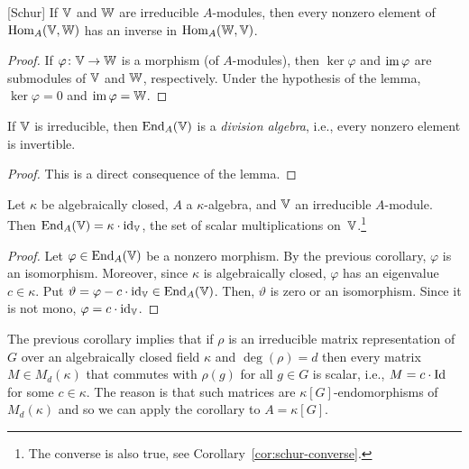 \begin{lem}\label{lem:schur}{\rm[Schur]}
    If\/ $\mathbb V$ and\/ $\mathbb W$ are irreducible\/ $A$-modules, then every nonzero element of\/ ${\rm Hom}_A(\mathbb V,\mathbb W)$ has an inverse in\/ ${\rm Hom}_A(\mathbb W,\mathbb V)$.
\end{lem}

\begin{proof}
    If $\varphi\colon\mathbb V\to\mathbb W$ is a morphism (of $A$-modules), then $\ker\varphi$ and $\operatorname{im}\varphi$ are submodules of $\mathbb V$ and $\mathbb W$, respectively. Under the hypothesis of the lemma, $\ker\varphi=0$ and $\operatorname{im}\varphi=\mathbb W$.
\end{proof}

\begin{cor}
    If\/ $\mathbb V$ is irreducible, then\/ ${\operatorname{End}}_A(\mathbb V)$ is a \textsl{division algebra}, i.e., every nonzero element is invertible.
\end{cor}

\begin{proof}
    This is a direct consequence of the lemma.
\end{proof}

\begin{cor}\label{cor:alg-closed-scalar-multiplications}
    Let\/ $\kappa$ be algebraically closed, $A$ a\/ $\kappa$-algebra, and\/ $\mathbb V$ an irreducible\/ $A$-module. Then\/ ${\operatorname{End}}_A(\mathbb V) = \kappa \cdot \operatorname{id}_\mathbb V$, the set of scalar multiplications on\/~$\mathbb V$.\footnote{The converse is also true, see Corollary~\ref{cor:schur-converse}.}
\end{cor}

\begin{proof}
    Let $\varphi\in {\operatorname{End}}_A(\mathbb V)$ be a nonzero morphism. By the previous corollary, $\varphi$ is an isomorphism. Moreover, since $\kappa$ is algebraically closed, $\varphi$ has an eigenvalue $c\in\kappa$. Put $\vartheta=\varphi-c\cdot\operatorname{id}_\mathbb V\in {\operatorname{End}}_A(\mathbb V)$. Then, $\vartheta$ is zero or an isomorphism. Since it is not mono, $\varphi=c\cdot\operatorname{id}_\mathbb V$.
\end{proof}

\begin{rem}\label{rem:scalar-matrix}
    The previous corollary implies that if $\rho$ is an irreducible matrix representation of $G$ over an algebraically closed field $\kappa$ and $\deg(\rho)=d$ then every matrix $M\in M_d(\kappa)$ that commutes with $\rho(g)$ for all\/ $g\in G$ is scalar, i.e., $M=c\cdot\operatorname{Id}$ for some\/ $c\in\kappa$. The reason is that such matrices are $\kappa[G]$-endomorphisms of $M_d(\kappa)$ and so we can apply the corollary to $A=\kappa[G]$.
\end{rem}

